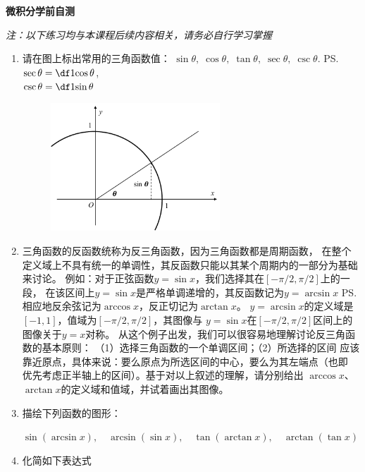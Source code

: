 
\begin{center}
	{\Large\bf 微积分学前自测}
	
	{\it 注：以下练习均与本课程后续内容相关，请务必自行学习掌握}
\end{center}
\begin{enumerate}
  \item 请在图上标出常用的三角函数值：
  $\sin\theta,\;\cos\theta,\;\tan\theta,\;
  \sec\theta,\;\csc\theta.$
  \ps{$\sec\theta=\df1{\cos\theta}$,\\ $\csc\theta=\df1{\sin\theta}$}
  \begin{figure}[!htb]
  	\centering
  	\includegraphics[width=0.6\textwidth]{./Images/ch00/selfTest/triFuncs.pdf}
  \end{figure}
  \item 三角函数的反函数统称为{\kaishu 反三角函数}，因为三角函数都是周期函数，
  在整个定义域上不具有统一的单调性，其反函数只能以其某个周期内的一部分为基础来讨论。
  例如：对于正弦函数$y=\sin x$，我们选择其在$[-\pi/2,\pi/2]$上的一段，
  在该区间上$y=\sin x$是严格单调递增的，其反函数记为$y=\arcsin x$
  \ps{相应地反余弦记为$\arccos x$，反正切记为$\arctan x$}。
  $y=\arcsin x$的定义域是$[-1,1]$，值域为$[-\pi/2,\pi/2]$，其图像与
  $y=\sin x$在$[-\pi/2,\pi/2]$区间上的图像关于$y=x$对称。
  从这个例子出发，我们可以很容易地理解讨论反三角函数的基本原则：
  {\kaishu（1）选择三角函数的一个单调区间；（2）所选择的区间
  应该靠近原点，具体来说：要么原点为所选区间的中心，要么为其左端点（也即
  优先考虑正半轴上的区间）}。基于对以上叙述的理解，请分别给出
  $\arccos x$、$\arctan x$的定义域和值域，并试着画出其图像。
  \item 描绘下列函数的图形：
  \begin{center}
    $\sin(\arcsin x),\quad \arcsin(\sin x),\quad
    \tan(\arctan x),\quad \arctan(\tan x)$
  \end{center}
  \item 化简如下表达式

\end{enumerate}
